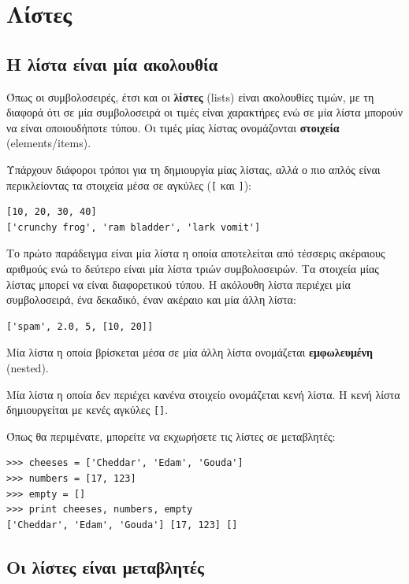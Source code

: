 \documentclass[10pt]{book}
\begin{document}
\chapter{Λίστες}

\section{Η λίστα είναι μία ακολουθία}
\label{sequence}

Όπως οι συμβολοσειρές, έτσι και οι {\bf λίστες} (lists) είναι ακολουθίες τιμών, με τη διαφορά ότι σε μία συμβολοσειρά οι τιμές είναι χαρακτήρες ενώ σε μία λίστα μπορούν να είναι οποιουδήποτε τύπου. Οι τιμές μίας λίστας ονομάζονται {\bf στοιχεία} (elements/items).

Υπάρχουν διάφοροι τρόποι για τη δημιουργία μίας λίστας, αλλά ο πιο απλός είναι 
περικλείοντας τα στοιχεία μέσα σε αγκύλες (\verb"[" και \verb"]"):

\begin{verbatim}
[10, 20, 30, 40]
['crunchy frog', 'ram bladder', 'lark vomit']
\end{verbatim}
%

Το πρώτο παράδειγμα είναι μία λίστα η οποία αποτελείται από τέσσερις ακέραιους αριθμούς ενώ το δεύτερο είναι μία λίστα τριών συμβολοσειρών. Τα στοιχεία μίας λίστας μπορεί να είναι διαφορετικού τύπου. Η ακόλουθη λίστα περιέχει μία συμβολοσειρά, ένα δεκαδικό, έναν ακέραιο και μία άλλη λίστα:

\begin{verbatim}
['spam', 2.0, 5, [10, 20]]
\end{verbatim}
%

Μία λίστα η οποία βρίσκεται μέσα σε μία άλλη λίστα ονομάζεται {\bf εμφωλευμένη} (nested).

Μία λίστα η οποία δεν περιέχει κανένα στοιχείο ονομάζεται κενή λίστα. Η κενή λίστα
δημιουργείται με κενές αγκύλες \verb"[]".

Όπως θα περιμένατε, μπορείτε να εκχωρήσετε τις λίστες σε μεταβλητές:

\begin{verbatim}
>>> cheeses = ['Cheddar', 'Edam', 'Gouda']
>>> numbers = [17, 123]
>>> empty = []
>>> print cheeses, numbers, empty
['Cheddar', 'Edam', 'Gouda'] [17, 123] []
\end{verbatim}
%


\section{Οι λίστες είναι μεταβλητές}
\label{mutable}
\end{document}
